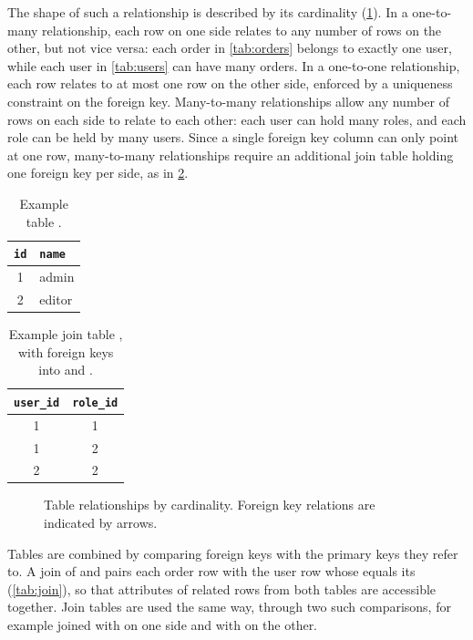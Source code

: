 The shape of such a relationship is described by its cardinality
(\cref{fig:cardinalities}).
In a one-to-many relationship, each row on one side relates
to any number of rows on the other, but not vice versa:
each order in \cref{tab:orders} belongs to exactly one user,
while each user in \cref{tab:users} can have many orders.
In a one-to-one relationship, each row relates to at most one row on the other side,
enforced by a uniqueness constraint on the foreign key.
Many-to-many relationships allow any number of rows on each side to relate to each other:
each user can hold many roles, and each role can be held by many users.
Since a single foreign key column can only point at one row,
many-to-many relationships require an additional join table
holding one foreign key per side, as in \cref{tab:user-roles}.

\begin{table}[H]
	\centering
	\begin{tabular}{|c|l|}
		\hline
		\texttt{id} & \texttt{name} \\
		\hline
		1           & admin         \\
		2           & editor        \\
		\hline
	\end{tabular}
	\caption{Example table .}
	\label{tab:roles}
\end{table}

\begin{table}[H]
	\centering
	\begin{tabular}{|c|c|}
		\hline
		\texttt{user\_id}      & \texttt{role\_id} \\
		\hline
		\textcolor{pink700}{1} & 1                 \\
		\textcolor{pink700}{1} & 2                 \\
		\textcolor{blue700}{2} & 2                 \\
		\hline
	\end{tabular}
	\caption{Example join table , with foreign keys into  and .}
	\label{tab:user-roles}
\end{table}

\begin{figure}[H]
	\centering
	
	\caption{Table relationships by cardinality. Foreign key relations are indicated by arrows.}
	\label{fig:cardinalities}
\end{figure}

Tables are combined by comparing foreign keys with the primary keys they refer to.
A join of  and  pairs each order row with the user row
whose  equals its  (\cref{tab:join}),
so that attributes of related rows from both tables are accessible together.
Join tables are used the same way, through two such comparisons,
for example  joined with  on one side
and with  on the other.

